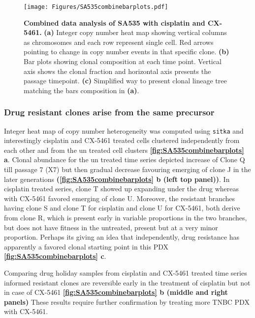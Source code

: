 


\begin{figure}
\centering
\texttt{[image: Figures/SA535combinebarplots.pdf]}
	
\caption[Combined data analysis of SA535 with cisplatin and CX-5461]
	{\small
	\textbf{Combined data analysis of SA535 with cisplatin and CX-5461.}
	   \textbf{(a)} Integer copy number heat map showing vertical columns as chromosomes and each row represent single cell. Red arrows pointing to change in copy number events in that specific clone.
	    \textbf{(b)} Bar plots showing clonal composition at each time point. Vertical axis shows the clonal fraction   and horizontal axis presents the passage timepoint.
	     \textbf{(c)} Simplified way to present clonal lineage tree matching the bars composition in \textbf{(a)}.
	}
	\label{fig:SA535combinebarplots}
\end{figure}


\subsubsection{Drug resistant clones arise from the same precursor}
Integer heat map of copy number heterogeneity was computed using \texttt{sitka} and interestingly cisplatin and CX-5461 treated cells clustered independently from each other and from the un treated cell clusters \textbf{\autoref{fig:SA535combinebarplots} a}. Clonal abundance for the un treated time series depicted increase of Clone Q till passage 7 (X7) but then gradual decrease favouring emerging of clone J in the later generations \textbf{(\autoref{fig:SA535combinebarplots} b (left top panel))}. In cisplatin treated series, clone T showed up expanding under the drug whereas with CX-5461 favored emerging of clone U.
Moreover, the resistant branches having clone S and clone T for cisplatin and clone U for CX-5461, both derive from clone R, which is present early in variable proportions in the two branches, but does not have fitness in the untreated, present but at a very minor proportion. Perhaps its giving an idea that independently, drug resistance has apparently a favored clonal starting point in this PDX \textbf{\autoref{fig:SA535combinebarplots} c}. 

Comparing drug holiday samples from cisplatin and CX-5461 treated time series informed resistant clones are reversible early in the treatment of cisplatin but not in case of CX-5461 \textbf{\autoref{fig:SA535combinebarplots} b (middle and right panels)}
These results require further confirmation by treating more TNBC PDX with CX-5461.



